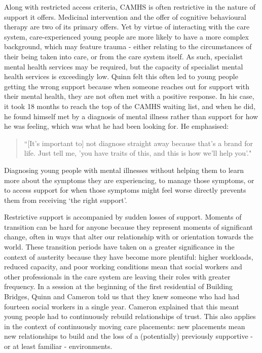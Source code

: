 Along with restricted access criteria, CAMHS is often restrictive in the nature of support it offers. Medicinal intervention and the offer of cognitive behavioural therapy are two of its primary offers. Yet by virtue of interacting with the care system, care-experienced young people are more likely to have a more complex background, which may feature trauma - either relating to the circumstances of their being taken into care, or from the care system itself. As such, specialist mental health services may be required, but the capacity of specialist mental health services is exceedingly low. Quinn felt this often led to young people getting the wrong support because when someone reaches out for support with their mental health, they are not often met with a positive response. In his case, it took 18 months to reach the top of the CAMHS waiting list, and when he did, he found himself met by a diagnosis of mental illness rather than support for how he was feeling, which was what he had been looking for. He emphasised:
\begin{quote}
“[It’s important to] not diagnose straight away because that's a brand for life. Just tell me, 'you have traits of this, and this is how we'll help you'."
\end{quote}
Diagnosing young people with mental illnesses without helping them to learn more about the symptoms they are experiencing, to manage those symptoms, or to access support for when those symptoms might feel worse directly prevents them from receiving ‘the right support’.

Restrictive support is accompanied by sudden losses of support. Moments of transition can be hard for anyone because they represent moments of significant change, often in ways that alter our relationship with or orientation towards the world. These transition periods have taken on a greater significance in the context of austerity because they have become more plentiful: higher workloads, reduced capacity, and poor working conditions mean that social workers and other professionals in the care system are leaving their roles with greater frequency. In a session at the beginning of the first residential of Building Bridges, Quinn and Cameron told us that they knew someone who had had fourteen social workers in a single year. Cameron explained that this meant young people had to continuously rebuild relationships of trust. This also applies in the context of continuously moving care placements: new placements mean new relationships to build and the loss of a (potentially) previously supportive - or at least familiar - environments.


